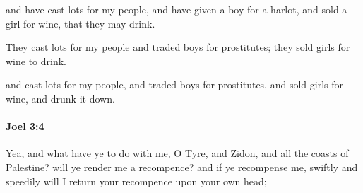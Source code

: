 			\begin{versebox}
					\item[BHS] 
					\item[LXX] 
					\item[ASV] and have cast lots for my people, and have given a boy for a harlot, and sold a girl for wine, that they may drink.
					\item[NIV] They cast lots for my people and traded boys for prostitutes; they sold girls for wine to drink.
					\item[NRSV] and cast lots for my people, and traded boys for prostitutes, and sold girls for wine, and drunk it down.
			\end{versebox}

		\paragraph{Joel 3:4} %
			\label{JOEL-3-4}

			Yea, and what have ye to do with me, O Tyre, and Zidon, and all the coasts of Palestine? will ye render me a recompence? and if ye recompense me, swiftly and speedily will I return your recompence upon your own head;

